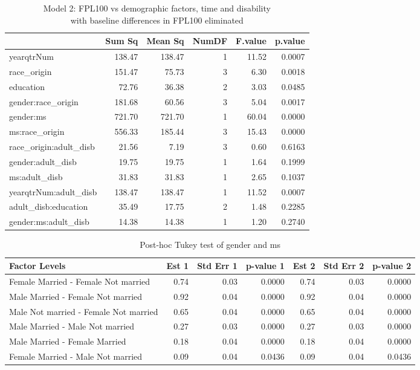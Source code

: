 \documentclass[11pt]{extarticle} %
\begin{document}
\noindent
\begin{table}[H]
\footnotesize
\centering
\begin{tabular}{lrrrrr}
  \hline
 & Sum Sq & Mean Sq & NumDF & F.value & p.value \\ 
  \hline
  yearqtrNum & 138.47 & 138.47 & 1 & 11.52 & 0.0007 \\ 
  race\_origin & 151.47 & 75.73 & 3 & 6.30 & 0.0018 \\ 
  education & 72.76 & 36.38 & 2 & 3.03 & 0.0485 \\ 
  gender:race\_origin & 181.68 & 60.56 & 3 & 5.04 & 0.0017 \\ 
  gender:ms & 721.70 & 721.70 & 1 & 60.04 & 0.0000 \\ 
  ms:race\_origin & 556.33 & 185.44 & 3 & 15.43 & 0.0000 \\ 
  race\_origin:adult\_disb & 21.56 & 7.19 & 3 & 0.60 & 0.6163 \\ 
  gender:adult\_disb & 19.75 & 19.75 & 1 & 1.64 & 0.1999 \\ 
  ms:adult\_disb & 31.83 & 31.83 & 1 & 2.65 & 0.1037 \\ 
  yearqtrNum:adult\_disb & 138.47 & 138.47 & 1 & 11.52 & 0.0007 \\ 
  adult\_disb:education & 35.49 & 17.75 & 2 & 1.48 & 0.2285 \\ 
  gender:ms:adult\_disb & 14.38 & 14.38 & 1 & 1.20 & 0.2740 \\ 
   \hline
\end{tabular}
\caption{Model 2: FPL100 vs demographic factors, time and disability \\ with baseline differences in FPL100 eliminated} 
\label{tab:Table2Anova2}
\end{table}

\begin{table}[H]
\footnotesize
\centering
\begin{tabular}{lrrrrrr}
  \hline
Factor Levels & Est 1 & Std Err 1 & p-value 1 & Est 2 & Std Err 2 & p-value 2 \\ 
  \hline
  Female Married -  Female Not married & 0.74 & 0.03 & 0.0000 & 0.74 & 0.03 & 0.0000 \\ 
    Male Married -  Female Not married & 0.92 & 0.04 & 0.0000 & 0.92 & 0.04 & 0.0000 \\ 
    Male Not married -  Female Not married & 0.65 & 0.04 & 0.0000 & 0.65 & 0.04 & 0.0000 \\ 
    Male Married -  Male Not married & 0.27 & 0.03 & 0.0000 & 0.27 & 0.03 & 0.0000 \\ 
    Male Married -  Female Married & 0.18 & 0.04 & 0.0000 & 0.18 & 0.04 & 0.0000 \\ 
    Female Married -  Male Not married & 0.09 & 0.04 & 0.0436 & 0.09 & 0.04 & 0.0436 \\ 
   \hline
\end{tabular}
\caption{Post-hoc Tukey test of gender and ms}
\label{tab:Table3GenderMS}
\end{table}
\end{document}
